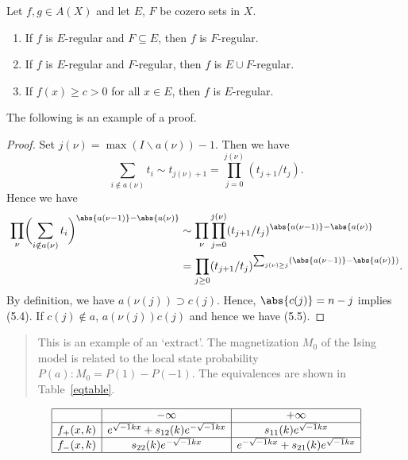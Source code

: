 \begin{lemma}
Let $f, g\in  A(X)$ and let $E$, $F$ be cozero sets in $X$.
\begin{enumerate}
\item If $f$ is $E$-regular and $F\subseteq E$, then $f$ is $F$-regular.

\item If $f$ is $E$-regular and $F$-regular, then $f$ is $E\cup
F$-regular.

\item If $f(x)\ge c>0$ for all $x\in E$, then $f$ is $E$-regular.

\end{enumerate}
\end{lemma}

The following is an example of a proof.

\begin{proof} Set $j(\nu)=\max(I\backslash a(\nu))-1$. Then we have
\[
\sum_{i\notin a(\nu)}t_i\sim t_{j(\nu)+1}
  =\prod^{j(\nu)}_{j=0}(t_{j+1}/t_j).
\]
Hence we have
\begin{equation}
\begin{split}
\prod_\nu\biggl(\sum_{i\notin
  a(\nu)}t_i\biggr)^{\abs{a(\nu-1)}-\abs{a(\nu)}}
&\sim\prod_\nu\prod^{j(\nu)}_{j=0}
  (t_{j+1}/t_j)^{\abs{a(\nu-1)}-\abs{a(\nu)}}\\
&=\prod_{j\ge 0}(t_{j+1}/t_j)^{
  \sum_{j(\nu)\ge j}(\abs{a(\nu-1)}-\abs{a(\nu)})}.
\end{split}
\end{equation}
By definition, we have $a(\nu(j))\supset c(j)$. Hence, $\abs{c(j)}=n-j$
implies (5.4). If $c(j)\notin a$, $a(\nu(j))c(j)$ and hence
we have (5.5).
\end{proof}

\begin{quotation}
This is an example of an `extract'. The magnetization $M_0$ of the Ising
model is related to the local state probability $P(a):M_0=P(1)-P(-1)$.
The equivalences are shown in Table~\ref{eqtable}.
\end{quotation}

\begin{table}[ht]
\caption{}\label{eqtable}
\renewcommand\arraystretch{1.5}
\noindent\[
\begin{array}{|c|c|c|}
\hline
&{-\infty}&{+\infty}\\
\hline
{f_+(x,k)}&e^{\sqrt{-1}kx}+s_{12}(k)e^{-\sqrt{-1}kx}&s_{11}(k)e^
{\sqrt{-1}kx}\\
\hline
{f_-(x,k)}&s_{22}(k)e^{-\sqrt{-1}kx}&e^{-\sqrt{-1}kx}+s_{21}(k)e^{\sqrt
{-1}kx}\\
\hline
\end{array}
\]
\end{table}

